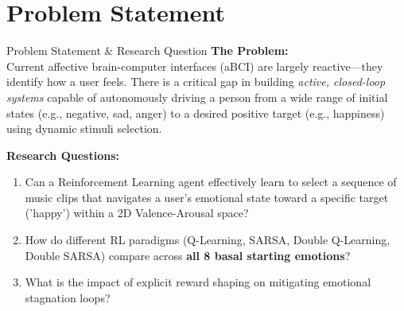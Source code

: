 \documentclass[10pt, aspectratio=169]{beamer}
\begin{document}
\section{Problem Statement}
\begin{frame}{Problem Statement \& Research Question}
    \textbf{The Problem:} \\
    Current affective brain-computer interfaces (aBCI) are largely reactive—they identify how a user feels. There is a critical gap in building \textit{active, closed-loop systems} capable of autonomously driving a person from a wide range of initial states (e.g., negative, sad, anger) to a desired positive target (e.g., happiness) using dynamic stimuli selection.

    \vspace{0.5cm}
    \textbf{Research Questions:}
    \begin{enumerate}
        \item Can a Reinforcement Learning agent effectively learn to select a sequence of music clips that navigates a user's emotional state toward a specific target ('happy') within a 2D Valence-Arousal space?
        \item How do different RL paradigms (Q-Learning, SARSA, Double Q-Learning, Double SARSA) compare across \textbf{all 8 basal starting emotions}?
        \item What is the impact of explicit reward shaping on mitigating emotional stagnation loops?
    \end{enumerate}
\end{frame}

\end{document}
